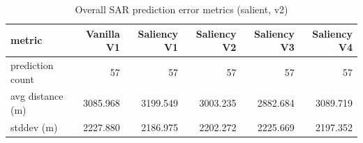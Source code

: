 \begin{table}[ht]
\centering
\caption{Overall SAR prediction error metrics (salient, v2)}
\label{tab:sar-overall-errors-salient,-v2}
\begin{tabular}{lrrrrr}
\hline
metric & Vanilla V1 & Saliency V1 & Saliency V2 & Saliency V3 & Saliency V4 \\
\hline
prediction count & 57 & 57 & 57 & 57 & 57 \\
avg distance (m) & 3085.968 & 3199.549 & 3003.235 & 2882.684 & 3089.719 \\
stddev (m) & 2227.880 & 2186.975 & 2202.272 & 2225.669 & 2197.352 \\
\hline
\end{tabular}
\end{table}
